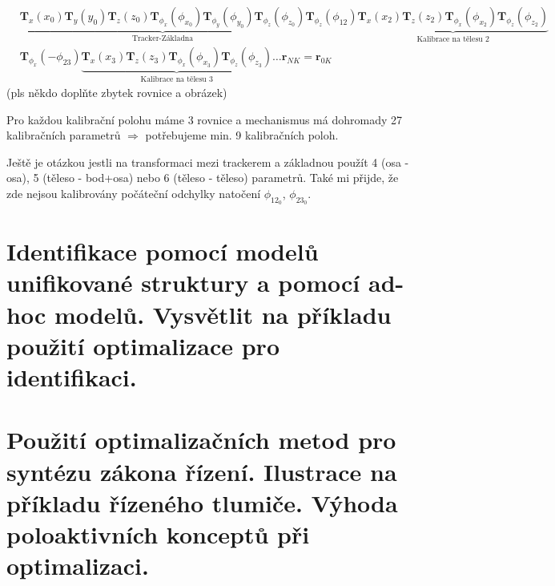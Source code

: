 \documentclass{article}
\begin{document}
	\begin{align}
		&\underbrace{
			\bm{T}_x(x_0)\bm{T}_y(y_0)\bm{T}_z(z_0)\bm{T}_{\phi_x}(\phi_{x_0})\bm{T}_{\phi_y}(\phi_{y_0})\bm{T}_{\phi_z}(\phi_{z_0})
		}_{\text{Tracker-Základna}}
		\bm{T}_{\phi_z}(\phi_{12})
		\underbrace{
			\bm{T}_x(x_2)\bm{T}_z(z_2)\bm{T}_{\phi_x}(\phi_{x_2})\bm{T}_{\phi_z}(\phi_{z_2})
		}_{\text{Kalibrace na tělesu 2}}\\&
		\bm{T}_{\phi_x}(-\phi_{23})
		\underbrace{
			\bm{T}_x(x_3)\bm{T}_z(z_3)\bm{T}_{\phi_x}(\phi_{x_3})\bm{T}_{\phi_z}(\phi_{z_3})
		}_{\text{Kalibrace na tělesu 3}}
		\ldots
		\bm{r}_{N K} = \bm{r}_{0K}
	\end{align}
	(pls někdo doplňte zbytek rovnice a obrázek)

	Pro každou kalibrační polohu máme 3 rovnice a mechanismus má dohromady 27 kalibračních parametrů $\Rightarrow$ potřebujeme min. 9 kalibračních poloh.

	Ještě je otázkou jestli na transformaci mezi trackerem a základnou použít 4 (osa - osa), 5 (těleso - bod+osa) nebo 6 (těleso - těleso) parametrů. Také mi přijde, že zde nejsou kalibrovány počáteční odchylky natočení $\phi_{12_0}$, $\phi_{23_0}$.

	\section{Identifikace pomocí modelů unifikované struktury a pomocí ad-hoc modelů. Vysvětlit na příkladu použití optimalizace pro identifikaci.}

	\section{Použití optimalizačních metod pro syntézu zákona řízení. Ilustrace na příkladu řízeného tlumiče. Výhoda poloaktivních konceptů při optimalizaci.}
\end{document}
